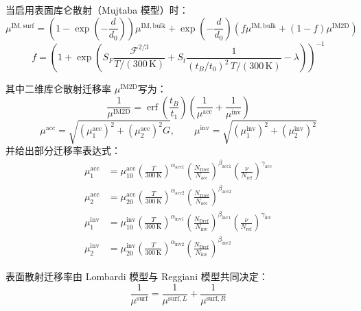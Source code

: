 \documentclass[12pt, a4paper, UTF8]{article}
\begin{document}
当启用表面库仑散射（Mujtaba 模型）时：
\begin{equation}
\mu^{\mathrm{IM,surf}}=\left(1-\exp\left(-\frac{d}{d_0}\right)\right)\mu^{\mathrm{IM,bulk}}+\exp\left(-\frac{d}{d_0}\right)\left(f\mu^{\mathrm{IM,bulk}}+(1-f)\mu^{\mathrm{IM2D}}\right)
\end{equation}
\begin{equation}
f=\left(1+\exp\left(S_F\frac{\mathcal{F}^{2/3}}{T/(300\,\mathrm{K})}+S_t\frac{1}{(t_B/t_0)^2\,T/(300\,\mathrm{K})}-\lambda\right)\right)^{-1}
\end{equation}

其中二维库仑散射迁移率 $\mu^{\mathrm{IM2D}}$写为：
\begin{equation}
\frac{1}{\mu^{\mathrm{IM2D}}}=\operatorname{erf}\left(\frac{t_B}{t_1}\right)\left(\frac{1}{\mu^{\mathrm{acc}}}+\frac{1}{\mu^{\mathrm{inv}}}\right)
\end{equation}
\begin{equation}
\mu^{\mathrm{acc}}=\sqrt{\left(\mu_{1}^{\mathrm{acc}}\right)^2+\left(\mu_{2}^{\mathrm{acc}}\right)^2G},\qquad
\mu^{\mathrm{inv}}=\sqrt{\left(\mu_{1}^{\mathrm{inv}}\right)^2+\left(\mu_{2}^{\mathrm{inv}}\right)^2}
\end{equation}
并给出部分迁移率表达式：
\begin{align}
\mu_{1}^{\mathrm{acc}}&=\mu_{10}^{\mathrm{acc}}\left(\frac{T}{300\,\mathrm{K}}\right)^{\alpha_{\mathrm{acc}1}}\left(\frac{N_{\mathrm{Dref}}}{N_{\mathrm{acc}}}\right)^{\beta_{\mathrm{acc}1}}\left(\frac{\nu}{N_{\mathrm{ref}}}\right)^{\gamma_{\mathrm{acc}}}\\
\mu_{2}^{\mathrm{acc}}&=\mu_{20}^{\mathrm{acc}}\left(\frac{T}{300\,\mathrm{K}}\right)^{\alpha_{\mathrm{acc}2}}\left(\frac{N_{\mathrm{Dref}}}{N_{\mathrm{acc}}}\right)^{\beta_{\mathrm{acc}2}}\\
\mu_{1}^{\mathrm{inv}}&=\mu_{10}^{\mathrm{inv}}\left(\frac{T}{300\,\mathrm{K}}\right)^{\alpha_{\mathrm{inv}1}}\left(\frac{N_{\mathrm{Dref}}}{N_{\mathrm{inv}}}\right)^{\beta_{\mathrm{inv}1}}\left(\frac{\nu}{N_{\mathrm{ref}}}\right)^{\gamma_{\mathrm{inv}}}\\
\mu_{2}^{\mathrm{inv}}&=\mu_{20}^{\mathrm{inv}}\left(\frac{T}{300\,\mathrm{K}}\right)^{\alpha_{\mathrm{inv}2}}\left(\frac{N_{\mathrm{Dref}}}{N_{\mathrm{inv}}}\right)^{\beta_{\mathrm{inv}2}}
\end{align}

表面散射迁移率由 Lombardi 模型与 Reggiani 模型共同决定：
\begin{equation}
\frac{1}{\mu^{\mathrm{surf}}}=\frac{1}{\mu^{\mathrm{surf},L}}+\frac{1}{\mu^{\mathrm{surf},R}}
\end{equation}
\end{document}
